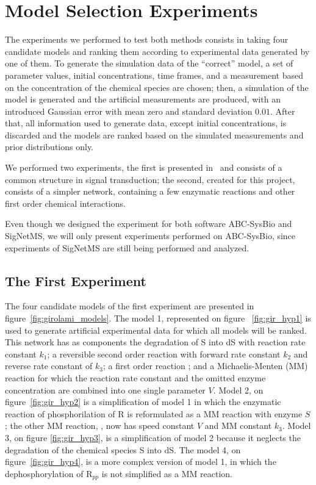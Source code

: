 \section{Model Selection Experiments}
The experiments we performed to test both methods consists in taking 
four candidate models and ranking them according to experimental data 
generated by one of them. To generate the simulation data of the 
``correct'' model, a set of parameter values, initial concentrations, 
time frames, and a measurement based on the concentration of the 
chemical species are chosen; then, a simulation of the model is 
generated and the artificial measurements are produced, with an 
introduced Gaussian error with mean zero and standard deviation $0.01$. 
After that, all information used to generate data, except initial 
concentrations, is discarded and the models are ranked based on the 
simulated measurements and prior distributions only.

We performed two experiments, the first is presented 
in~\cite{Vyshemirsky2007} and consists of a common structure in signal 
transduction; the second, created for this project, consists of a 
simpler network, containing a few enzymatic reactions and other first 
order chemical interactions.

Even though we designed the experiment for both software ABC-SysBio and
SigNetMS, we will only present experiments performed on ABC-SysBio, 
since experiments of SigNetMS are still being performed and analyzed.


\subsection{The First Experiment}
\label{sec:experiment_one}
The four candidate models of the first experiment are presented in 
figure~\ref{fig:girolami_models}. The model 1, represented on figure
~\ref{fig:gir_hyp1} is used to generate artificial experimental data
for which all models will be ranked. This network has as components the
degradation of S into dS with reaction rate constant $k_1$; a reversible 
second order reaction  with forward rate constant $k_2$ 
and reverse rate constant of $k_3$; a first order reaction 
; and a Michaelis-Menten (MM) reaction  
for which the reaction rate constant and the omitted enzyme 
concentration are combined into one single parameter $V$. Model 2, on 
figure~\ref{fig:gir_hyp2} is a simplification of model 1 in which the
enzymatic reaction of phosphorilation of R is reformulated as a 
MM reaction with enzyme $S$; the other MM reaction, , 
now has speed constant $V$ and MM constant $k_3$. Model 3, on figure
\ref{fig:gir_hyp3}, is a simplification of model 2 because it neglects 
the degradation of the chemical species S into dS. The model 4, on 
figure~\ref{fig:gir_hyp4}, is a more complex version of model 1, in 
which the dephosphorylation of R$_{pp}$ is not simplified as a MM 
reaction.

